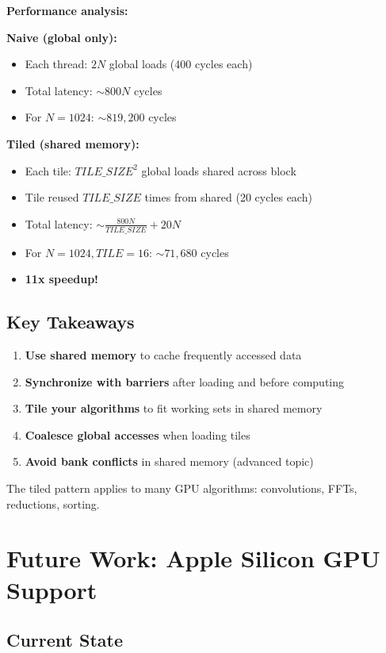 \documentclass[11pt]{article}
\begin{document}
\textbf{Performance analysis:}

\textbf{Naive (global only):}
\begin{itemize}[noitemsep]
  \item Each thread: $2N$ global loads (400 cycles each)
  \item Total latency: $\sim 800N$ cycles
  \item For $N=1024$: $\sim 819,200$ cycles
\end{itemize}

\textbf{Tiled (shared memory):}
\begin{itemize}[noitemsep]
  \item Each tile: $TILE\_SIZE^2$ global loads shared across block
  \item Tile reused $TILE\_SIZE$ times from shared (20 cycles each)
  \item Total latency: $\sim \frac{800N}{TILE\_SIZE} + 20N$
  \item For $N=1024, TILE=16$: $\sim 71,680$ cycles
  \item \textbf{11x speedup!}
\end{itemize}

\subsection{Key Takeaways}

\begin{enumerate}[noitemsep]
  \item \textbf{Use shared memory} to cache frequently accessed data
  \item \textbf{Synchronize with barriers} after loading and before computing
  \item \textbf{Tile your algorithms} to fit working sets in shared memory
  \item \textbf{Coalesce global accesses} when loading tiles
  \item \textbf{Avoid bank conflicts} in shared memory (advanced topic)
\end{enumerate}

The tiled pattern applies to many GPU algorithms: convolutions, FFTs, reductions, sorting.

\section{Future Work: Apple Silicon GPU Support}

\subsection{Current State}
\end{document}
